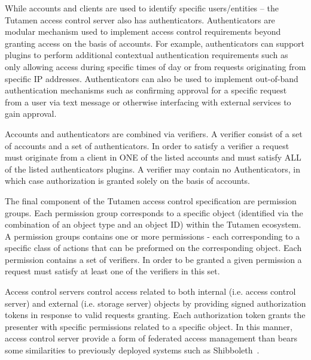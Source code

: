 While accounts and clients are used to identify specific
users/entities -- the Tutamen access control server also has
authenticators. Authenticators are modular mechanism used to implement
access control requirements beyond granting access on the basis of
accounts. For example, authenticators can support plugins to perform
additional contextual authentication requirements such as only
allowing access during specific times of day or from requests
originating from specific IP addresses. Authenticators can also be
used to implement out-of-band authentication mechanisms such as
confirming approval for a specific request from a user via text
message or otherwise interfacing with external services to gain
approval.

Accounts and authenticators are combined via verifiers. A verifier
consist of a set of accounts and a set of authenticators. In order to
satisfy a verifier a request must originate from a client in ONE of
the listed accounts and must satisfy ALL of the listed authenticators
plugins. A verifier may contain no Authenticators, in which case
authorization is granted solely on the basis of accounts.

The final component of the Tutamen access control specification are
permission groups. Each permission group corresponds to a specific
object (identified via the combination of an object type and an object
ID) within the Tutamen ecosystem. A permission groups contains one or
more permissions - each corresponding to a specific class of actions
that can be preformed on the corresponding object. Each permission
contains a set of verifiers. In order to be granted a given permission
a request must satisfy at least one of the verifiers in this set.

Access control servers control access related to both internal
(i.e. access control server) and external (i.e. storage server)
objects by providing signed authorization tokens in response to valid
requests granting. Each authorization token grants the presenter with
specific permissions related to a specific object. In this manner,
access control server provide a form of federated access management
than bears some similarities to previously deployed systems such as
Shibboleth~\cite{leandro2012}.

